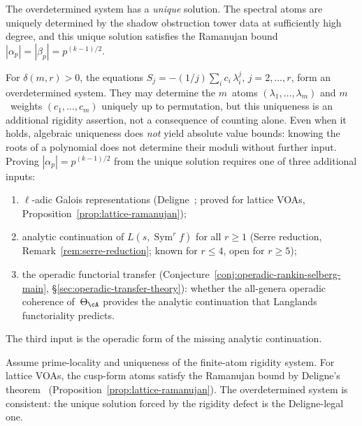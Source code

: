 \begin{conjecture}%
\label{conj:modular-spectral-rigidity-sharp}%
\ClaimStatusConjectured%
%
The overdetermined system has a \emph{unique} solution. The
spectral atoms are uniquely determined by the shadow obstruction tower data
at sufficiently high degree, and this unique solution satisfies
the Ramanujan bound
$|\alpha_p| = |\beta_p| = p^{(k-1)/2}$.
\end{conjecture}

\begin{remark}%
\label{rem:overdetermination-honest}%
%
For $\delta(m,r) > 0$, the equations
$S_j = -(1/j)\sum_i c_i\,\lambda_i^j$,
$j = 2,\ldots,r$, form an overdetermined system. They may determine
the $m$~atoms $(\lambda_1,\ldots,\lambda_m)$ and $m$~weights
$(c_1,\ldots,c_m)$ uniquely up to permutation, but this uniqueness is
an additional rigidity assertion, not a consequence of counting alone.
Even when it holds, algebraic uniqueness does \emph{not} yield
absolute value bounds: knowing the roots of a polynomial
does not determine their moduli without further input.
Proving $|\alpha_p| = p^{(k-1)/2}$ from the unique
solution requires one of three additional inputs:
\begin{enumerate}[label=\textup{(\alph*)}]
\item
$\ell$-adic Galois representations
(Deligne~\cite{Deligne1974};
proved for lattice VOAs,
Proposition~\ref{prop:lattice-ramanujan});
\item
analytic continuation of
$L(s,\operatorname{Sym}^r f)$ for all $r \geq 1$
(Serre reduction, Remark~\ref{rem:serre-reduction};
known for $r \leq 4$, open for $r \geq 5$);
\item
the operadic functorial transfer
(Conjecture~\ref{conj:operadic-rankin-selberg-main},
\S\ref{sec:operadic-transfer-theory}):
whether the all-genera operadic coherence of~$\Theta_\cA$
provides the analytic continuation that Langlands
functoriality predicts.
\end{enumerate}
The third input is the operadic form of the missing analytic
continuation.
\end{remark}

\begin{proposition}%
\label{prop:lattice-ramanujan-rigidity}%
\ClaimStatusProvedHere%
%
Assume prime-locality and uniqueness of the finite-atom rigidity
system. For lattice VOAs, the cusp-form atoms satisfy the Ramanujan
bound by Deligne's theorem~\cite{Deligne1974}
\textup{(}Proposition~\textup{\ref{prop:lattice-ramanujan}}\textup{)}.
The overdetermined system is consistent:
the unique solution forced by the rigidity
defect is the Deligne-legal one.
\end{proposition}

